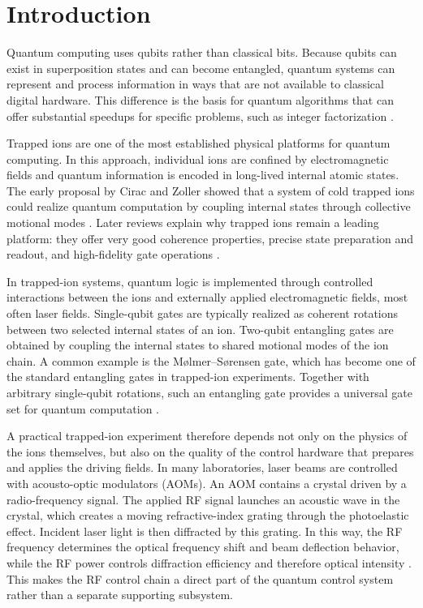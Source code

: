 \chapter{Introduction}

Quantum computing uses qubits rather than classical bits. Because qubits can exist in superposition states and can become entangled, quantum systems can represent and process information in ways that are not available to classical digital hardware. This difference is the basis for quantum algorithms that can offer substantial speedups for specific problems, such as integer factorization \cite{nielsen_chuang,shor1994}.

Trapped ions are one of the most established physical platforms for quantum computing. In this approach, individual ions are confined by electromagnetic fields and quantum information is encoded in long-lived internal atomic states. The early proposal by Cirac and Zoller showed that a system of cold trapped ions could realize quantum computation by coupling internal states through collective motional modes \cite{cirac_zoller_1995}. Later reviews explain why trapped ions remain a leading platform: they offer very good coherence properties, precise state preparation and readout, and high-fidelity gate operations \cite{wineland1998,haffner2008,bruzewicz2019}.

In trapped-ion systems, quantum logic is implemented through controlled interactions between the ions and externally applied electromagnetic fields, most often laser fields. Single-qubit gates are typically realized as coherent rotations between two selected internal states of an ion. Two-qubit entangling gates are obtained by coupling the internal states to shared motional modes of the ion chain. A common example is the M{\o}lmer--S{\o}rensen gate, which has become one of the standard entangling gates in trapped-ion experiments. Together with arbitrary single-qubit rotations, such an entangling gate provides a universal gate set for quantum computation \cite{molmer_sorensen_1999,bruzewicz2019,wineland1998}.

A practical trapped-ion experiment therefore depends not only on the physics of the ions themselves, but also on the quality of the control hardware that prepares and applies the driving fields. In many laboratories, laser beams are controlled with acousto-optic modulators (AOMs). An AOM contains a crystal driven by a radio-frequency signal. The applied RF signal launches an acoustic wave in the crystal, which creates a moving refractive-index grating through the photoelastic effect. Incident laser light is then diffracted by this grating. In this way, the RF frequency determines the optical frequency shift and beam deflection behavior, while the RF power controls diffraction efficiency and therefore optical intensity \cite{isomet_aomod,isomet_aohome,isomet_aofs}. This makes the RF control chain a direct part of the quantum control system rather than a separate supporting subsystem.

